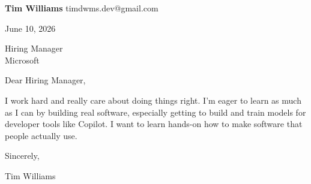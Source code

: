 \documentclass[12pt]{article}
\begin{document}
\textbf{Tim Williams} \hfill timdwms.dev@gmail.com

\vspace{1em}

June 10, 2026

\vspace{1em}

Hiring Manager \\
Microsoft

\vspace{1em}

Dear Hiring Manager,

I work hard and really care about doing things right. I'm eager to learn as much as I can by building real software, especially getting to build and train models for developer tools like Copilot. I want to learn hands-on how to make software that people actually use.

\vspace{1em}

Sincerely,

\vspace{2em}

Tim Williams
\end{document}
